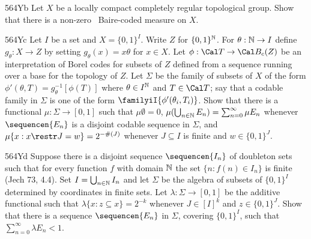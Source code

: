 {\spheader 564Yb
Let $X$ be a locally compact completely regular topological group.
Show that there is a non-zero \lti\ Baire-coded measure on $X$.

\spheader 564Yc
Let $I$ be a set and $X=\{0,1\}^I$.   Write $Z$ for
$\{0,1\}^{\Bbb N}$.   For
$\theta:\Bbb N\to I$ define $g_{\theta}:X\to Z$ by setting
$g_{\theta}(x)=x\theta$ for $x\in X$.   Let
$\phi:\Cal T\to\Cal B_c(Z)$ be an interpretation of Borel codes for subsets
of $Z$ defined from a sequence running over a base for the topology of $Z$.
Let $\Sigma$ be the family of
subsets of $X$ of the form $\phi'(\theta,T)=g_{\theta}^{-1}[\phi(T)]$ where
$\theta\in I^{\Bbb N}$ and $T\in\Cal T$;  say that a codable family in
$\Sigma$ is one of the form $\familyiI{\phi'(\theta_i,T_i)}$.
Show that there is a functional $\mu:\Sigma\to[0,1]$ such that
$\mu\emptyset=0$, $\mu(\bigcup_{n\in\Bbb N}E_n)=\sum_{n=0}^{\infty}\mu E_n$
whenever $\sequencen{E_n}$ is a disjoint codable sequence in $\Sigma$, and
$\mu\{x:x\restr J=w\}=2^{-\#(J)}$ whenever $J\subseteq I$ is finite and
$w\in\{0,1\}^J$.

\spheader 564Yd
Suppose there is a disjoint sequence $\sequencen{I_n}$ of doubleton sets
such that for every function $f$ with domain $\Bbb N$ the set
$\{n:f(n)\in I_n\}$ is finite ({\smc Jech 73}, 4.4).   Set
$I=\bigcup_{n\in\Bbb N}I_n$ and let $\Sigma$ be the algebra of subsets of
$\{0,1\}^I$ determined by coordinates in finite sets.   Let
$\lambda:\Sigma\to[0,1]$ be the additive functional such that
$\lambda\{x:z\subseteq x\}=2^{-k}$ whenever $J\in[I]^k$ and
$z\in\{0,1\}^J$.   Show that there is a sequence $\sequencen{E_n}$ in
$\Sigma$, covering $\{0,1\}^I$, such that
$\sum_{n=0}^{\infty}\lambda E_n<1$.
}%

